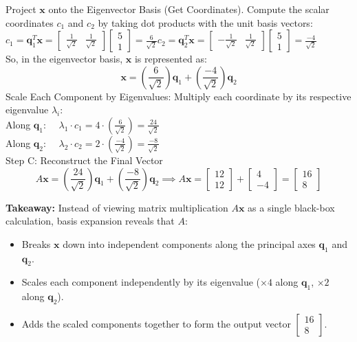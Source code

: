 \documentclass[DIV=20,oneside]{scrartcl}
\newcommand{\takeaway}[1]{%
	\begin{tcolorbox}[
		colback=black!20,
		colframe=black,
		boxrule=0.5pt,
		arc=2mm]
		\textbf{Takeaway: } #1
	\end{tcolorbox}
}
\begin{document}
\begin{itemize}
	Project $\mathbf{x}$ onto the Eigenvector Basis (Get Coordinates). Compute the scalar coordinates $c_1$ and $c_2$ by taking dot products with the unit basis vectors:$c_1 = \mathbf{q}_1^T \mathbf{x} = \begin{bmatrix} \frac{1}{\sqrt{2}} & \frac{1}{\sqrt{2}} \end{bmatrix} \begin{bmatrix} 5 \\ 1 \end{bmatrix} = \frac{6}{\sqrt{2}}$$c_2 = \mathbf{q}_2^T \mathbf{x} = \begin{bmatrix} -\frac{1}{\sqrt{2}} & \frac{1}{\sqrt{2}} \end{bmatrix} \begin{bmatrix} 5 \\ 1 \end{bmatrix} = \frac{-4}{\sqrt{2}}$\\So, in the eigenvector basis, $\mathbf{x}$ is represented as:$$\mathbf{x} = \left(\frac{6}{\sqrt{2}}\right) \mathbf{q}_1 + \left(\frac{-4}{\sqrt{2}}\right) \mathbf{q}_2$$
	Scale Each Component by Eigenvalues: Multiply each coordinate by its respective eigenvalue $\lambda_i$:\\
	Along $\mathbf{q}_1$: $\quad \lambda_1 \cdot c_1 = 4 \cdot \left(\frac{6}{\sqrt{2}}\right) = \frac{24}{\sqrt{2}}$\\
	Along $\mathbf{q}_2$: $\quad \lambda_2 \cdot c_2 = 2 \cdot \left(\frac{-4}{\sqrt{2}}\right) = \frac{-8}{\sqrt{2}}$\\
	Step C: Reconstruct the Final Vector
	$$A\mathbf{x} = \left(\frac{24}{\sqrt{2}}\right) \mathbf{q}_1 + \left(\frac{-8}{\sqrt{2}}\right) \mathbf{q}_2 \implies A\mathbf{x} = \begin{bmatrix} 12 \\ 12 \end{bmatrix} + \begin{bmatrix} 4 \\ -4 \end{bmatrix} = \begin{bmatrix} 16 \\ 8 \end{bmatrix}$$
	
	\takeaway{Instead of viewing matrix multiplication $A\mathbf{x}$ as a single black-box calculation, basis expansion reveals that $A$:
	\begin{itemize}
		\item Breaks $\mathbf{x}$ down into independent components along the principal axes $\mathbf{q}_1$ and $\mathbf{q}_2$.
		\item Scales each component independently by its eigenvalue ($\times 4$ along $\mathbf{q}_1$, $\times 2$ along $\mathbf{q}_2$).
		\item Adds the scaled components together to form the output vector $\begin{bmatrix} 16 \\ 8 \end{bmatrix}$.
		\end{itemize}	}
	

\end{itemize}
\end{document}
